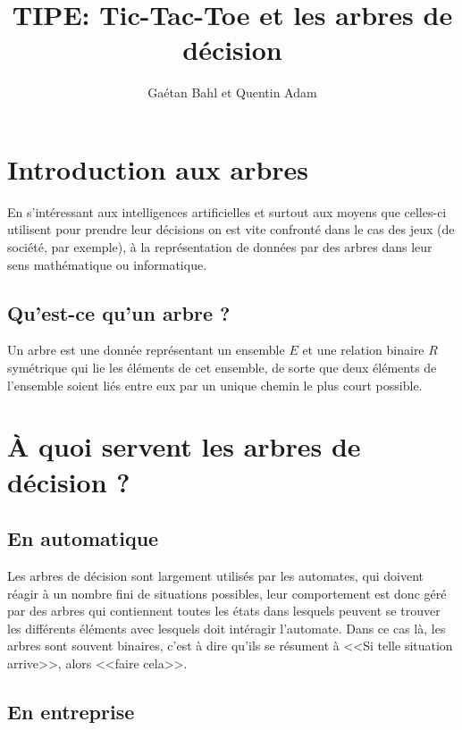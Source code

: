 \documentclass{article}
\title{TIPE: Tic-Tac-Toe et les arbres de décision}
\author{Gaétan Bahl et Quentin Adam}
\begin{document}
\maketitle
\tableofcontents


\clearpage

\section{Introduction aux arbres}

En s'intéressant aux intelligences artificielles et surtout aux moyens que
celles-ci utilisent pour prendre leur décisions
on est vite confronté dans le cas des jeux (de société, par exemple), à la
représentation de données par des arbres dans leur sens mathématique ou
informatique.

\subsection{Qu'est-ce qu'un arbre ?}

Un arbre est une donnée représentant un ensemble $E$ et une relation binaire $R$
symétrique qui lie les éléments de cet ensemble,
de sorte que deux éléments de l'ensemble soient liés entre eux par un unique
chemin le plus court possible.






\section{\uppercase{à} quoi servent les arbres de décision ?}

\subsection{En automatique}

Les arbres de décision sont largement utilisés par les automates,
 qui doivent réagir à un nombre fini de situations possibles, 
leur comportement est donc géré par des arbres qui contiennent
 toutes les états dans lesquels peuvent se trouver les différents 
éléments avec lesquels doit intéragir l'automate.
Dans ce cas là, les arbres sont souvent binaires, 
c'est à dire qu'ils se résument à <<Si telle situation arrive>>, alors <<faire
cela>>.

\subsection{En entreprise}
\end{document}
